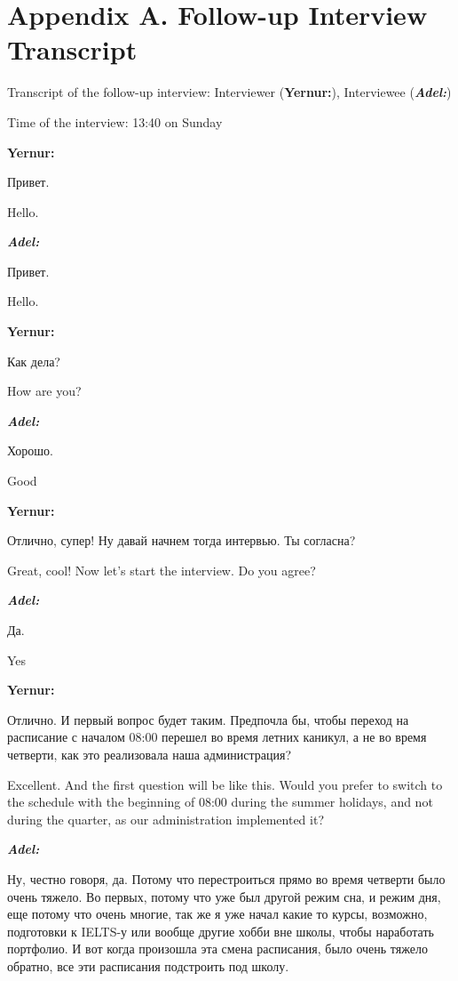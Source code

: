 \newpage
\section{\textbf{Appendix A. Follow-up Interview Transcript}}

Transcript of the follow-up interview: Interviewer (\textbf{Yernur:}), Interviewee (\textbf{\textit{Adel:}})

Time of the interview: 13:40 on Sunday

\textbf{Yernur:}

Привет.

Hello.

\textbf{\textit{Adel:}}

Привет.

Hello.

\textbf{Yernur:}

Как дела?

How are you?

\textbf{\textit{Adel:}}

Хорошо.

Good

\textbf{Yernur:}

Отлично, супер! Ну давай начнем тогда интервью. Ты согласна?

Great, cool! Now let’s start the interview. Do you agree?

\textbf{\textit{Adel:}}

Да.

Yes

\textbf{Yernur:}

Отлично. И первый вопрос будет таким. Предпочла бы, чтобы переход на расписание с началом 08:00 перешел во время летних каникул, а не во время четверти, как это реализовала наша администрация?

Excellent. And the first question will be like this. Would you prefer to switch to the schedule with the beginning of 08:00 during the summer holidays, and not during the quarter, as our administration implemented it?

\textbf{\textit{Adel:}}

Ну, честно говоря, да. Потому что перестроиться прямо во время четверти было очень тяжело. Во первых, потому что уже был другой режим сна, и режим дня, еще потому что очень многие, так же я уже начал какие то курсы, возможно, подготовки к IELTS-у или вообще другие хобби вне школы, чтобы наработать портфолио. И вот когда произошла эта смена расписания, было очень тяжело обратно, все эти расписания подстроить под школу.

